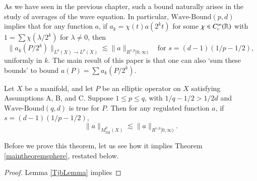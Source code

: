 As we have seen in the previous chapter, such a bound naturally arises in the study of averages of the wave equation. In particular, $\text{Wave-Bound}(p,d)$ implies that for any function $a$, if $a_k = \chi(t) a(2^k t)$ for some $\chi \in C_c^\infty(\operatorname{\mathbb{R}})$ with $1 = \sum \chi(\lambda/2^k)$ for $\lambda \neq 0$, then
%
\begin{equation}
    \| a_k(P/2^k) \|_{L^p(X) \to L^p(X)} \lesssim \| a \|_{R^{s,p}[0,\infty)} \quad\text{for $s = (d-1)(1/p - 1/2)$},
\end{equation}
%
uniformly in $k$. The main result of this paper is that one can also `sum these bounds' to bound $a(P) = \sum a_k(P/2^k)$.

\begin{theorem} \label{mainatomictheorem}
    Let $X$ be a manifold, and let $P$ be an elliptic operator on $X$ satisfying Assumptions A, B, and C. Suppose $1 \leq p \leq q$, with $1/q - 1/2 > 1/2d$ and $\text{Wave-Bound}(q,d)$ is true for $P$. Then for any regulated function $a$, if $s = (d-1)(1/p - 1/2)$,
    \[ \| a \|_{M^p_{\text{Dil}}(X)} \lesssim \| a \|_{R^{s,p}[0,\infty)}. \]
\end{theorem}

Before we prove this theorem, let us see how it implies Theorem \ref{maintheoremsphere}, restated below.

\thmmaintheoremsphere*

\begin{proof}
    Lemma \ref{TjbLemma} implies 
\end{proof}


